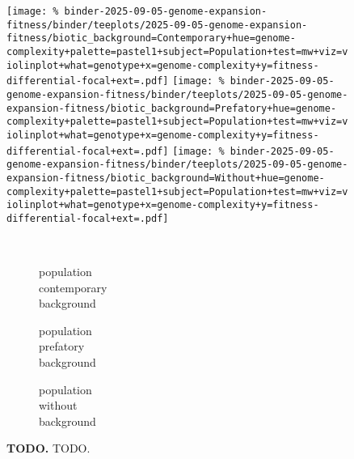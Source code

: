 \begin{figure}
\begin{minipage}{\linewidth}
\texttt{[image: \%
binder-2025-09-05-genome-expansion-fitness/binder/teeplots/2025-09-05-genome-expansion-fitness/biotic\_background=Contemporary+hue=genome-complexity+palette=pastel1+subject=Population+test=mw+viz=violinplot+what=genotype+x=genome-complexity+y=fitness-differential-focal+ext=.pdf]}
\texttt{[image: \%
binder-2025-09-05-genome-expansion-fitness/binder/teeplots/2025-09-05-genome-expansion-fitness/biotic\_background=Prefatory+hue=genome-complexity+palette=pastel1+subject=Population+test=mw+viz=violinplot+what=genotype+x=genome-complexity+y=fitness-differential-focal+ext=.pdf]}%
\texttt{[image: \%
binder-2025-09-05-genome-expansion-fitness/binder/teeplots/2025-09-05-genome-expansion-fitness/biotic\_background=Without+hue=genome-complexity+palette=pastel1+subject=Population+test=mw+viz=violinplot+what=genotype+x=genome-complexity+y=fitness-differential-focal+ext=.pdf]}

\vspace{-1ex}

\begin{subfigure}{0.135\linewidth}
~
\end{subfigure}%
\begin{subfigure}{0.305\linewidth}
    \centering
    \caption{\footnotesize population\\contemporary\\background}
    \label{fig:fitness-gcomplexity:population-contemporary}
\end{subfigure}%
\begin{subfigure}{0.305\linewidth}
    \centering
    \caption{\footnotesize population\\prefatory\\background}
    \label{fig:fitness-gcomplexity:population-prefatory}
\end{subfigure}%
\begin{subfigure}{0.255\linewidth}
    \centering
    \caption{\footnotesize population\\without\\background}
    \label{fig:fitness-gcomplexity:population-without}
\end{subfigure}
\end{minipage}


\caption{
    \textbf{TODO.}
    \footnotesize
    TODO.
}
\label{fig:fitness-gcomplexity}

\end{figure}
